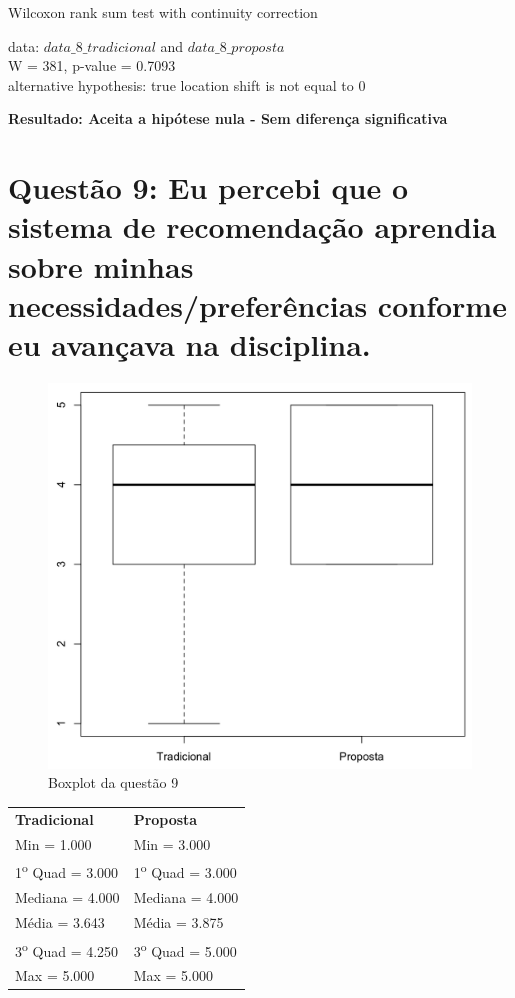 Wilcoxon rank sum test with continuity correction

\noindent
data:  $data\_8\_tradicional$ and $data\_8\_proposta$\\
W = 381, p-value = 0.7093\\
alternative hypothesis: true location shift is not equal to 0

\noindent
\textbf{Resultado: Aceita a hipótese nula - Sem diferença significativa}

\newpage
\section{Questão 9: Eu percebi que o sistema de recomendação aprendia sobre minhas necessidades/preferências conforme eu avançava na disciplina.}

\begin{figure}[htb]
  \caption{\label{fig:questao9-boxplot}Boxplot da questão 9}
  \begin{center}
      \includegraphics[scale=0.4]{./Figuras/questao9-boxplot.png}
  \end{center}
\end{figure}

\begin{table}[h]
\begin{tabular}{p{}p{}}
\textbf{Tradicional} & \textbf{Proposta} \\
Min = 1.000 & Min = 3.000\\
1\textsuperscript{o} Quad = 3.000 & 1\textsuperscript{o} Quad = 3.000\\
Mediana = 4.000 & Mediana = 4.000\\
Média = 3.643 & Média = 3.875\\
3\textsuperscript{o} Quad = 4.250 & 3\textsuperscript{o} Quad = 5.000\\
Max = 5.000 & Max = 5.000\\
\end{tabular}
\end{table}

